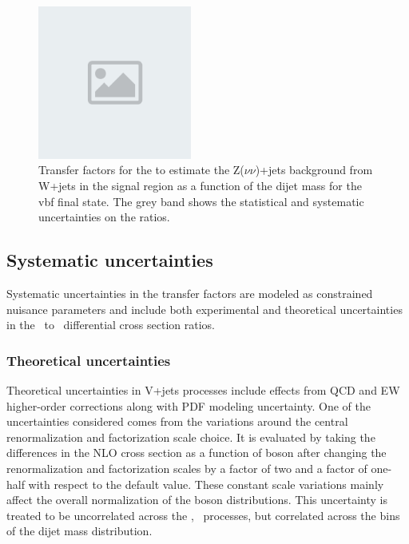 \begin{figure}[htbp]
  \centering
  \includegraphics[width=0.45\textwidth]{placeholder.png}
  \caption{Transfer factors for the to estimate the Z($\nu\nu$)+jets background from W+jets in the signal region as a function of the dijet mass for the vbf final state. The grey band shows the statistical and systematic uncertainties on the ratios.}
  \label{fig:WZ_SF_vbf}
\end{figure}

\subsection{Systematic uncertainties}

Systematic uncertainties in the transfer factors are
modeled as constrained nuisance parameters and include both
experimental and theoretical uncertainties
in the \Wjets~to \Zjets~differential cross section ratios.

\subsubsection{Theoretical uncertainties}

Theoretical uncertainties in V+jets processes include effects from QCD and EW higher-order
corrections along with PDF modeling uncertainty. One of the uncertainties considered comes from the
variations around the central renormalization and factorization scale choice. It is evaluated by taking the differences in the NLO cross
section as a function of boson \pt after changing the renormalization and factorization scales by a factor of two and a factor
of one-half with respect to the default value. These constant scale variations mainly affect the
overall normalization of the boson \pt distributions. This uncertainty is treated to be uncorrelated
across the \Zjets, \Wjets~processes, but correlated across the bins of the dijet mass distribution.

